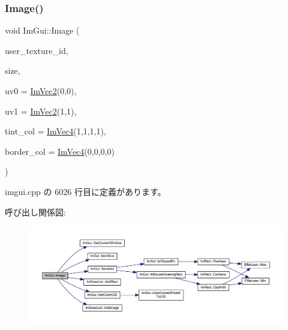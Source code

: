 \subsubsection{\texorpdfstring{Image()}{Image()}}
{\footnotesize\ttfamily void Im\+Gui\+::\+Image (\begin{DoxyParamCaption}\item[{\mbox{\hyperlink{imgui_8h_a364f4447ecbc4ca176145ccff9db6286}{Im\+Texture\+ID}}}]{user\+\_\+texture\+\_\+id,  }\item[{const \mbox{\hyperlink{struct_im_vec2}{Im\+Vec2}} \&}]{size,  }\item[{const \mbox{\hyperlink{struct_im_vec2}{Im\+Vec2}} \&}]{uv0 = {\ttfamily \mbox{\hyperlink{struct_im_vec2}{Im\+Vec2}}(0,0)},  }\item[{const \mbox{\hyperlink{struct_im_vec2}{Im\+Vec2}} \&}]{uv1 = {\ttfamily \mbox{\hyperlink{struct_im_vec2}{Im\+Vec2}}(1,1)},  }\item[{const \mbox{\hyperlink{struct_im_vec4}{Im\+Vec4}} \&}]{tint\+\_\+col = {\ttfamily \mbox{\hyperlink{struct_im_vec4}{Im\+Vec4}}(1,1,1,1)},  }\item[{const \mbox{\hyperlink{struct_im_vec4}{Im\+Vec4}} \&}]{border\+\_\+col = {\ttfamily \mbox{\hyperlink{struct_im_vec4}{Im\+Vec4}}(0,0,0,0)} }\end{DoxyParamCaption})}



 imgui.\+cpp の 6026 行目に定義があります。

呼び出し関係図\+:\nopagebreak
\begin{figure}[H]
\begin{center}
\leavevmode
\includegraphics[width=350pt]{namespace_im_gui_ad8705ac3b718c1b2e84e7b8c34f90249_cgraph}
\end{center}
\end{figure}
\mbox{\label{namespace_im_gui_ac79ef64e8b9e1db73d8237f6a999da14}} 
